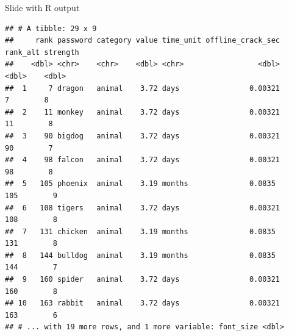 \documentclass[10pt,ignorenonframetext,aspectratio=169]{beamer}
\begin{document}
\begin{frame}[fragile]{Slide with R output}
\begin{verbatim}
## # A tibble: 29 x 9
##     rank password category value time_unit offline_crack_sec rank_alt strength
##    <dbl> <chr>    <chr>    <dbl> <chr>                 <dbl>    <dbl>    <dbl>
##  1     7 dragon   animal    3.72 days                0.00321        7        8
##  2    11 monkey   animal    3.72 days                0.00321       11        8
##  3    90 bigdog   animal    3.72 days                0.00321       90        7
##  4    98 falcon   animal    3.72 days                0.00321       98        8
##  5   105 phoenix  animal    3.19 months              0.0835       105        9
##  6   108 tigers   animal    3.72 days                0.00321      108        8
##  7   131 chicken  animal    3.19 months              0.0835       131        8
##  8   144 bulldog  animal    3.19 months              0.0835       144        7
##  9   160 spider   animal    3.72 days                0.00321      160        8
## 10   163 rabbit   animal    3.72 days                0.00321      163        6
## # ... with 19 more rows, and 1 more variable: font_size <dbl>
\end{verbatim}
\end{frame}
\end{document}
